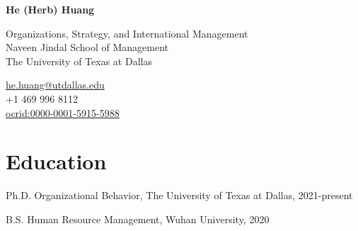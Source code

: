 \documentclass[11pt,letterpaper]{report} %
\newcommand{\myname}{He (Herb) Huang}
\newcommand{\namefont}[1]{{\normalfont\bfseries\Huge{#1}}}
\begin{document}
    \raggedright{}

    \namefont{\myname}

    \vspace{1em}
    \begin{minipage}[t]{0.700\textwidth}
        Organizations, Strategy, and International Management \\
        Naveen Jindal School of Management \\
        The University of Texas at Dallas
    \end{minipage}
    \begin{minipage}[t]{0.295\textwidth}
        \flushright{}
        \href{mailto:he.huang@utdallas.edu}{he.huang@utdallas.edu} \\
        +1 469 996 8112 \\
        \href{https://orcid.org/0000-0001-5915-5988}{ocrid:0000-0001-5915-5988}
    \end{minipage}


    \section*{Education}

    \begin{tablist}

        \item[Ph.D.] \tab{}Organizational Behavior, The University of Texas at Dallas, 2021-present
        \item[B.S.]  \tab{}Human Resource Management, Wuhan University, 2020

    \end{tablist}





\end{document}
